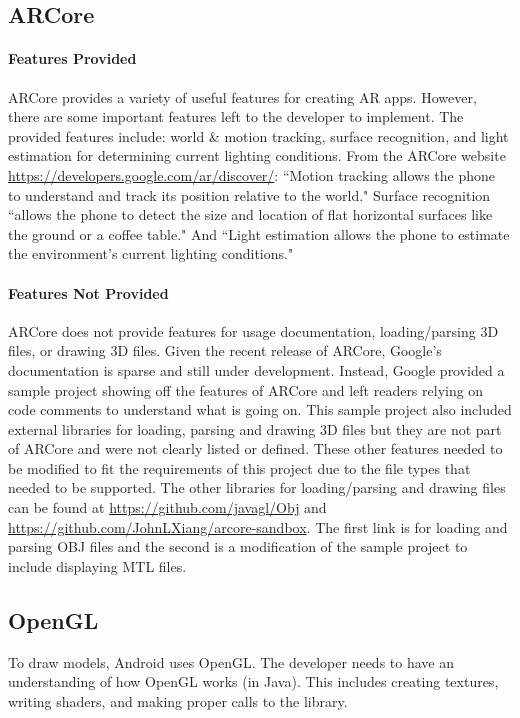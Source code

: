 \subsection{ARCore}
    \paragraph{Features Provided}

    ARCore provides a variety of useful features for creating AR apps. However, there are some important features left to the developer to implement. The provided features include: world \& motion tracking, surface recognition, and light estimation for determining current lighting conditions. From the ARCore website \url{https://developers.google.com/ar/discover/}: ``Motion tracking allows the phone to understand and track its position relative to the world." Surface recognition ``allows the phone to detect the size and location of flat horizontal surfaces like the ground or a coffee table." And ``Light estimation allows the phone to estimate the environment's current lighting conditions."

    \paragraph{Features Not Provided}

    ARCore does not provide features for usage documentation, loading/parsing 3D files, or drawing 3D files. Given the recent release of ARCore, Google's documentation is sparse and still under development. Instead, Google provided a sample project showing off the features of ARCore and left readers relying on code comments to understand what is going on. This sample project also included external libraries for loading, parsing and drawing 3D files but they are not part of ARCore and were not clearly listed or defined. These other features needed to be modified to fit the requirements of this project due to the file types that needed to be supported. The other libraries for loading/parsing and drawing files can be found at \url{https://github.com/javagl/Obj} and \url{https://github.com/JohnLXiang/arcore-sandbox}. The first link is for loading and parsing OBJ files and the second is a modification of the sample project to include displaying MTL files.

\subsection{OpenGL}
    To draw models, Android uses OpenGL. The developer needs to have an understanding of how OpenGL works (in Java). This includes creating textures, writing shaders, and making proper calls to the library.

